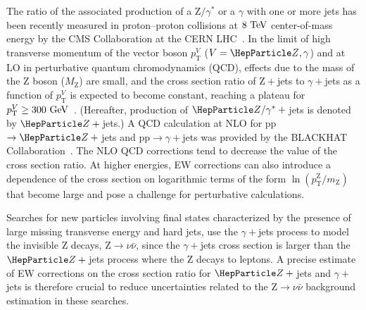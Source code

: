 \documentclass[11pt]{cernrep}
\begin{document}
The ratio of the associated production of a $\mathrm{Z}/\gamma^*$ or a
$\gamma$ with one or more jets has been recently measured in
proton--proton collisions at $8~\text{TeV}$ center-of-mass energy by the CMS
Collaboration at the CERN LHC~\cite{Khachatryan:2015ira}. In the limit
of high transverse momentum of the vector boson $p_{\mathrm{T}}^{V}$
($V=\PZ,\gamma$) and at LO in perturbative quantum chromodynamics
(QCD), effects due to the mass of the Z boson ($M_\mathrm{Z}$) are
small, and the cross section ratio of Z${}+{}$jets to $\gamma+{}$jets
as a function of $p_{\mathrm{T}}^{V}$ is expected to become constant,
reaching a plateau for $p_{\mathrm{T}}^{V} \geq
300~\text{GeV}$~\cite{StirlingPaperZGamma}. (Hereafter, production of
$\PZ/\gamma^*+{}$jets is denoted by $\PZ+{}$jets.) A QCD calculation at
NLO for pp$\to\PZ+{}$jets and pp$\to\gamma+{}$jets
was provided by the {\sc BLACKHAT} Collaboration~\cite{BlackHat}.  The
NLO QCD corrections tend to decrease the value of the cross section
ratio. At higher energies, EW corrections can also
introduce a dependence of the cross section on logarithmic terms of
the form $\ln(p_{\mathrm{T}}^{\mathrm{Z}}/m_{\mathrm{Z}})$ that become
large and pose a challenge for perturbative calculations.

Searches for new particles involving final states characterized by the
presence of large missing transverse energy and hard jets, use the
$\gamma+{}$jets process to model the invisible Z decays,
Z$\to\nu\bar{\nu}$, since the $\gamma+{}$jets cross section is larger
than the $\PZ+{}$jets process where the Z decays to leptons. A precise
estimate of EW corrections on the cross section ratio for $\PZ+{}$jets and
$\gamma+{}$jets is therefore crucial to reduce uncertainties related to
the Z$\to\nu\bar{\nu}$ background estimation in these searches.
\end{document}
